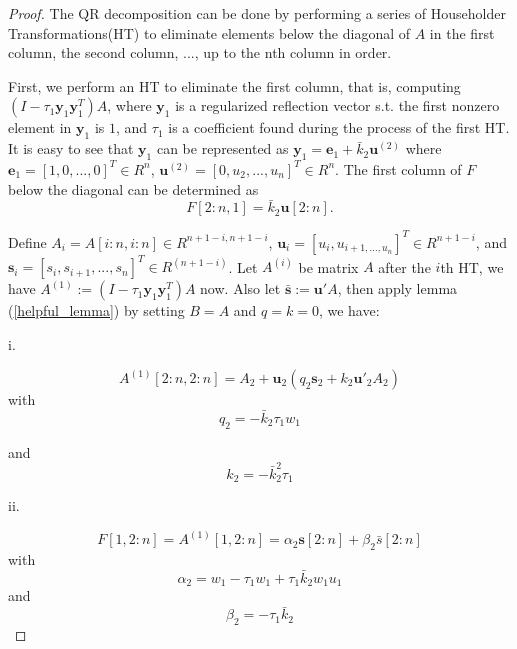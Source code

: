 \documentclass{article}
\begin{document}
\begin{proof}

The QR decomposition can be done by performing a series of Householder Transformations(HT) to eliminate elements below the diagonal of $A$ in the first column, the second column, ..., up to the nth column in order.

First, we perform an HT to eliminate the first column, that is, computing $(I-\tau_1 \mathbf{y}_1 \mathbf{y}^T_1)A$, where $\mathbf{y}_1$ is a regularized reflection vector s.t. the first nonzero element in $\mathbf{y}_1$ is $1$, and $\tau_1$ is a coefficient found during the process of the first HT. It is easy to see that $\mathbf{y}_1$ can be represented as $\mathbf{y}_1=\mathbf{e}_1+\bar{k}_2\mathbf{u}^{(2)}$ where $\mathbf{e}_1=[1,0,...,0]^T \in R^n$, $\mathbf{u}^{(2)}=[0,u_2,...,u_n]^T \in R^n$. The first column of $F$ below the diagonal can be determined as
\begin{equation}
F[2:n, 1]=\bar{k}_2\mathbf{u}[2:n].
\end{equation}

Define $A_i=A[i:n,i:n]\in R^{n+1-i,n+1-i}$, $\mathbf{u}_i=[u_i,u_{i+1,...,u_n}]^T\in R^{n+1-i}$, and $\mathbf{s}_i=[s_i,s_{i+1},...,s_n]^T\in R^{(n+1-i)}$. Let $A^{(i)}$ be matrix $A$ after the $i$th HT, we have $A^{(1)}:=(I-\tau_1 \mathbf{y}_1 \mathbf{y}^T_1)A$ now. Also let $\bar{\mathbf{s}}:=\mathbf{u}'A$, then apply lemma (\ref{helpful_lemma}) by setting $B=A$ and $q=k=0$, we have:

i.

\begin{equation}
A ^{(1)}[2:n,2:n]=A_2+\mathbf{u}_2(q_2\mathbf{s}_2+k_2\mathbf{u}'_2A_2)
\end{equation}
with 
\begin{equation}
q_2=-\bar{k}_2\tau_1w_1
\end{equation}

and
\begin{equation}
    k_2=-\bar{k}_2^2\tau_1
\end{equation}

ii.

\begin{equation}
    F[1,2:n]=A^{(1)}[1,2:n]=\alpha_2 \mathbf{s}[2:n]+\beta_2 \bar{s}[2:n]
\end{equation}
with
\begin{equation}
    \alpha_2=w_1-\tau_1 w_1+\tau_1 \bar{k}_2w_1u_1
\end{equation}
and
\begin{equation}
    \beta_2=-\tau_1\bar{k}_2
\end{equation}



\end{proof}
\end{document}
